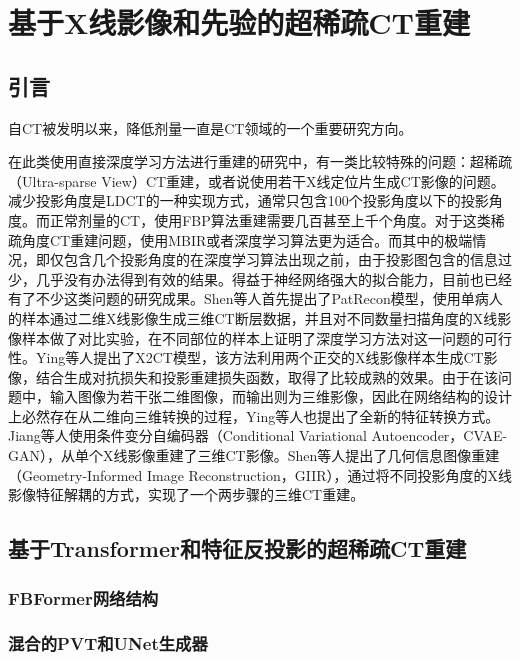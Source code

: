 
\chapter{基于X线影像和先验的超稀疏CT重建}

\section{引言}
自CT被发明以来，降低剂量一直是CT领域的一个重要研究方向。

在此类使用直接深度学习方法进行重建的研究中，有一类比较特殊的问题：超稀疏（Ultra-sparse View）CT重建，或者说使用若干X线定位片生成CT影像的问题。减少投影角度是LDCT的一种实现方式，通常只包含100个投影角度以下的投影角度。而正常剂量的CT，使用FBP算法重建需要几百甚至上千个角度。对于这类稀疏角度CT重建问题，使用MBIR或者深度学习算法更为适合。而其中的极端情况，即仅包含几个投影角度的在深度学习算法出现之前，由于投影图包含的信息过少，几乎没有办法得到有效的结果。得益于神经网络强大的拟合能力，目前也已经有了不少这类问题的研究成果。Shen等人首先提出了PatRecon模型，使用单病人的样本通过二维X线影像生成三维CT断层数据，并且对不同数量扫描角度的X线影像样本做了对比实验，在不同部位的样本上证明了深度学习方法对这一问题的可行性\cite{shenPatientspecificReconstructionVolumetric2019}。Ying等人提出了X2CT模型，该方法利用两个正交的X线影像样本生成CT影像，结合生成对抗损失和投影重建损失函数，取得了比较成熟的效果\cite{yingX2CTGANReconstructingCT2019}。由于在该问题中，输入图像为若干张二维图像，而输出则为三维影像，因此在网络结构的设计上必然存在从二维向三维转换的过程，Ying等人也提出了全新的特征转换方式。Jiang等人使用条件变分自编码器（Conditional Variational Autoencoder，CVAE-GAN），从单个X线影像重建了三维CT影像\cite{jiangReconstruction3DCT2021}。Shen等人提出了几何信息图像重建（Geometry-Informed Image Reconstruction，GIIR），通过将不同投影角度的X线影像特征解耦的方式，实现了一个两步骤的三维CT重建\cite{shenGeometryinformedDeepLearning2022}。

\section{基于Transformer和特征反投影的超稀疏CT重建}
\subsection{FBFormer网络结构}

\subsection{混合的PVT和UNet生成器}

